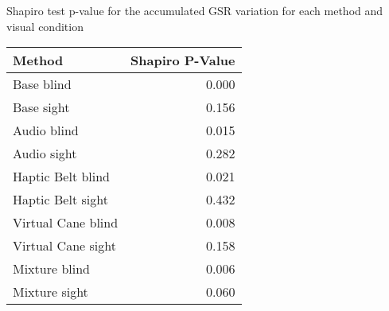 
\centering
\caption{Shapiro test p-value for the accumulated GSR variation for each method and visual condition}
\label{tab:shapiro_gsr_sum_etp}
\begin{tabular}{lr}
\toprule
            Method &  Shapiro P-Value \\
\midrule
        Base blind &            0.000 \\
        Base sight &            0.156 \\
       Audio blind &            0.015 \\
       Audio sight &            0.282 \\
 Haptic Belt blind &            0.021 \\
 Haptic Belt sight &            0.432 \\
Virtual Cane blind &            0.008 \\
Virtual Cane sight &            0.158 \\
     Mixture blind &            0.006 \\
     Mixture sight &            0.060 \\
\bottomrule
\end{tabular}
